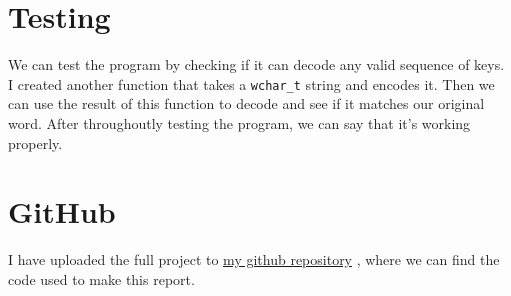 \documentclass[a4paper,11pt]{article}
\newcommand{\underlinehref}[2]{%
    \href{#1}{\ul{#2}}%
}
\begin{document}
     \section*{Testing}

     We can test the program by checking if it can decode any valid sequence of keys.
     I created another function that takes a {\tt wchar\_t} string and encodes it.
     Then we can use the result of this function to decode and see if it matches our original word.
     After throughoutly testing the program, we can say that it's working properly.
    
     \section*{GitHub}
    I have uploaded the full project to \underlinehref{https://github.com/peterherczku/ID1021/tree/main/assignment-8-B}{my github repository}, where we can find the code used to make this report.
\end{document}
